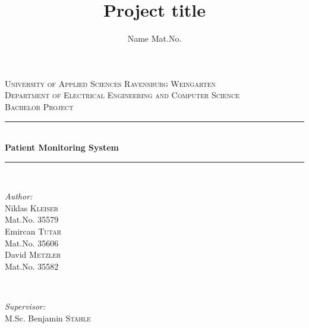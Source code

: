 \documentclass[a4paper,11pt,singlespacing]{article}
\title{Project title}
\author{
	Name Mat.No.
	}
\begin{document}
\setlength{\parindent}{0ex}

\begin{titlepage}
	
	\newcommand{\HRule}{\rule{\linewidth}{0.5mm}} %
	
	\center %
	
	
	\textsc{\LARGE University of Applied Sciences Ravensburg Weingarten}\\[1.5cm] %
	\textsc{\Large Department of
		Electrical Engineering
		and Computer Science}\\[0.5cm] %
	\textsc{\large Bachelor Project}\\[0.5cm] %
	
	
	\HRule \\[0.4cm]
	{ \huge \bfseries Patient Monitoring System}\\[0.4cm] %
	\HRule \\[1.5cm]
	
	
	\begin{minipage}{0.4\textwidth}
		\begin{flushleft} \large
			\emph{Author:}\\
			Niklas \textsc{Kleiser}\\ %
			Mat.No. 35579 \\
            Emircan \textsc{Tutar}\\ %
			Mat.No. 35606 \\
            David \textsc{Metzler}\\ %
			Mat.No. 35582
		\end{flushleft}
	\end{minipage}
	~
	\begin{minipage}{0.4\textwidth}
		\begin{flushright} \large
			\emph{Supervisor:} \\
			M.Sc. Benjamin \textsc{Stähle} %
		\end{flushright}
	\end{minipage}\\[2cm]
	

\end{titlepage}
\end{document}

